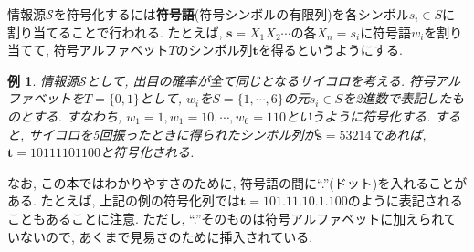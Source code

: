 \documentclass[12pt]{ltjsarticle}
\newtheorem{example}{例}
\begin{document}
情報源$\mathcal{S}$を符号化するには\textbf{符号語}(符号シンボルの有限列)を各シンボル$s_i \in S$に割り当てることで行われる.
たとえば, $\boldsymbol{s} = X_1 X_2 \cdots$の各$X_n = s_i$に符号語$w_i$を割り当てて,
符号アルファベット$T$のシンボル列$\boldsymbol{t}$を得るというようにする.
\begin{example}
  情報源$\mathcal{S}$として, 出目の確率が全て同じとなるサイコロを考える.
  符号アルファベットを$T = \{0, 1\}$として, $w_i$を$S = \{1, \cdots, 6\}$の元$s_i \in S$を2進数で表記したものとする.
  すなわち, $w_1 = 1, w_1 = 10, \cdots, w_6 = 110$というように符号化する.
  すると, サイコロを5回振ったときに得られたシンボル列が$\boldsymbol{s} = 53214$であれば,
  $\boldsymbol{t} = 10111101100$と符号化される.
\end{example}
\noindent
なお, この本ではわかりやすさのために, 符号語の間に``.''(ドット)を入れることがある.
たとえば, 上記の例の符号化列では$\boldsymbol{t} = 101.11.10.1.100$のように表記されることもあることに注意.
ただし, ``.''そのものは符号アルファベットに加えられていないので, あくまで見易さのために挿入されている.
\end{document}
